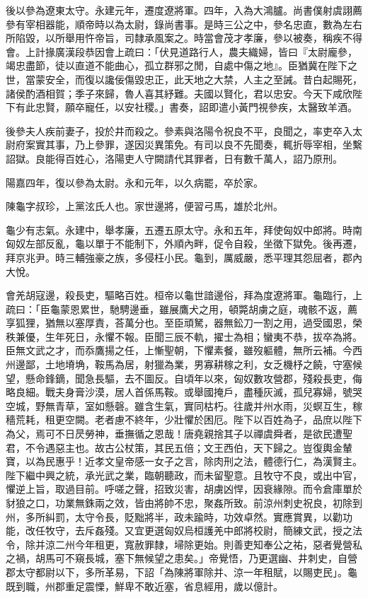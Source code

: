 \begin{pinyinscope}
後以參為遼東太守。永建元年，遷度遼將軍。四年，入為大鴻臚。尚書僕射虞詡薦參有宰相器能，順帝時以為太尉，錄尚書事。是時三公之中，參名忠直，數為左右所陷毀，以所舉用忤帝旨，司隸承風案之。時當會茂才孝廉，參以被奏，稱疾不得會。上計掾廣漢段恭因會上疏曰：「伏見道路行人，農夫織婦，皆曰『太尉龐參，竭忠盡節，徒以直道不能曲心，孤立群邪之閒，自處中傷之地』。臣猶冀在陛下之世，當蒙安全，而復以讒佞傷毀忠正，此天地之大禁，人主之至誡。昔白起賜死，諸侯酌酒相賀；季子來歸，魯人喜其紓難。夫國以賢化，君以忠安。今天下咸欣陛下有此忠賢，願卒寵任，以安社稷。」書奏，詔即遣小黃門視參疾，太醫致羊酒。

後參夫人疾前妻子，投於井而殺之。參素與洛陽令祝良不平，良聞之，率吏卒入太尉府案實其事，乃上參罪，遂因災異策免。有司以良不先聞奏，輒折辱宰相，坐繫詔獄。良能得百姓心，洛陽吏人守闕請代其罪者，日有數千萬人，詔乃原刑。

陽嘉四年，復以參為太尉。永和元年，以久病罷，卒於家。

陳龜字叔珍，上黨泫氏人也。家世邊將，便習弓馬，雄於北州。

龜少有志氣。永建中，舉孝廉，五遷五原太守。永和五年，拜使匈奴中郎將。時南匈奴左部反亂，龜以單于不能制下，外順內畔，促令自殺，坐徵下獄免。後再遷，拜京兆尹。時三輔強豪之族，多侵枉小民。龜到，厲威嚴，悉平理其怨屈者，郡內大悅。

會羌胡寇邊，殺長吏，驅略百姓。桓帝以龜世諳邊俗，拜為度遼將軍。龜臨行，上疏曰：「臣龜蒙恩累世，馳騁邊垂，雖展鷹犬之用，頓斃胡虜之庭，魂骸不返，薦享狐狸，猶無以塞厚責，荅萬分也。至臣頑駑，器無鈆刀一割之用，過受國恩，榮秩兼優，生年死日，永懼不報。臣聞三辰不軌，擢士為相；蠻夷不恭，拔卒為將。臣無文武之才，而忝鷹揚之任，上慚聖朝，下懼素餐，雖歿軀體，無所云補。今西州邊鄙，土地塉埆，鞍馬為居，射獵為業，男寡耕稼之利，女乏機杼之饒，守塞候望，懸命鋒鏑，聞急長驅，去不圖反。自頃年以來，匈奴數攻營郡，殘殺長吏，侮略良細。戰夫身膏沙漠，居人首係馬鞍。或舉國掩戶，盡種灰滅，孤兒寡婦，號哭空城，野無青草，室如懸磬。雖含生氣，實同枯朽。往歲并州水雨，災螟互生，稼穡荒耗，租更空闕。老者慮不終年，少壯懼於困厄。陛下以百姓為子，品庶以陛下為父，焉可不日昃勞神，垂撫循之恩哉！唐堯親捨其子以禪虞舜者，是欲民遭聖君，不令遇惡主也。故古公杖策，其民五倍；文王西伯，天下歸之。豈復輿金輦寶，以為民惠乎！近孝文皇帝感一女子之言，除肉刑之法，體德行仁，為漢賢主。陛下繼中興之統，承光武之業，臨朝聽政，而未留聖意。且牧守不良，或出中官，懼逆上旨，取過目前。呼嗟之聲，招致災害，胡虜凶悍，因衰緣隙。而令倉庫單於豺狼之口，功業無銖兩之效，皆由將帥不忠，聚姦所致。前涼州刺史祝良，初除到州，多所糾罰，太守令長，貶黜將半，政未踰時，功效卓然。實應賞異，以勸功能，改任牧守，去斥姦殘。又宜更選匈奴烏桓護羌中郎將校尉，簡練文武，授之法令，除并涼二州今年租更，寬赦罪隸，埽除更始。則善吏知奉公之祐，惡者覺營私之禍，胡馬可不窺長城，塞下無候望之患矣。」帝覺悟，乃更選幽、井刺史，自營郡太守都尉以下，多所革易，下詔「為陳將軍除并、涼一年租賦，以賜吏民」。龜既到職，州郡重足震慄，鮮卑不敢近塞，省息經用，歲以億計。


\end{pinyinscope}
